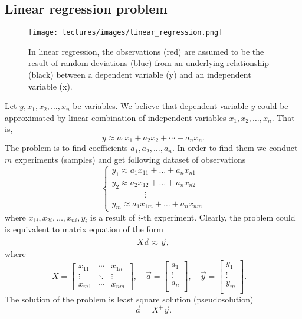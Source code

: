     \subsection*{Linear regression problem}

        \begin{wrapfigure}[18]{r}{0.33\columnwidth}
            \texttt{[image: lectures/images/linear\_regression.png]}
            \caption*{\scriptsize{In linear regression, the observations (red) are assumed to be the result of random deviations (blue) from an underlying relationship (black) between a dependent variable (y) and an independent variable (x).}}
            \label{fig:inconsistent_with_vectors}
        \end{wrapfigure}  
        
        Let $y,x_1,x_2,\ldots,x_n$ be variables. We believe that  dependent variable $y$ could be approximated by linear combination of independent variables $x_1,x_2,\ldots,x_n$. That is,
        $$
           y\approx  a_1x_1+a_2x_2+\cdots +a_nx_n .
        $$
        The problem is to find coefficients $a_1,a_2,\ldots,a_n$. In order to find them we conduct $m$ experiments (samples) and get following dataset of observations
        $$
        \begin{cases}
            y_1\approx a_1x_{11}+\ldots+a_nx_{n1} \nonumber\\    
            y_2\approx a_2x_{12}+\ldots+a_nx_{n2} \nonumber\\    ~~~~~~~~~~~~~~~~~~\vdots~~~~~~~~~~~~~~~~~\nonumber\\
            y_m\approx a_1x_{1m}+\ldots+a_nx_{nm} \nonumber
        \end{cases}
        $$ 
        where $x_{1i},x_{2i},\ldots,x_{ni},y_i$ is a result of $i$-th experiment. Clearly, the problem could is equivalent to matrix equation of the form   
        \begin{eqnarray}
            X\vec{a}\approx\vec{y},\nonumber
        \end{eqnarray}
        where 
        $$
            X=
            \begin{bmatrix}
                x_{11} & \cdots & x_{1n}\\
                \vdots & \ddots & \vdots\\
                x_{m1} & \cdots & x_{nm} 
            \end{bmatrix},
            \quad
            \vec{a}=
            \begin{bmatrix}
                a_{1}\\
                \vdots\\
                a_{n}\\
            \end{bmatrix},\quad
            \vec{y}=
            \begin{bmatrix}
                y_{1}\\
                \vdots\\
                y_{m}\\
            \end{bmatrix}.\quad
        $$
        The solution of the problem is least square solution (pseudosolution)
        $$
        \vec{a}=X^+\vec{y}.
        $$

